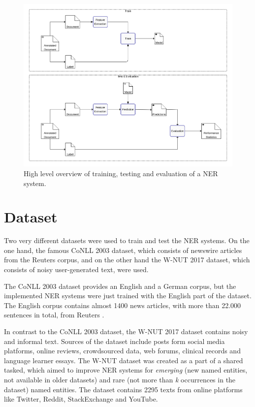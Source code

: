 \documentclass[12pt]{book}
\begin{document}
	\begin{figure}
		\begin{center}
			\includegraphics[width=\linewidth]{img/train_and_test.png}
		\end{center}
		\caption{High level overview of training, testing and evaluation of a NER system.}
		\label{fig:overview}
	\end{figure}


	\section{Dataset}
	
	Two very different datasets were used to train and test the NER systems. On the one hand, the famous CoNLL 2003 \cite{tjongkimsang2003conll} dataset, which consists of newswire articles from the Reuters corpus, and on the other hand the W-NUT 2017 \cite{derczynski2017results} dataset, which consists of noisy user-generated text, were used.
	
	The CoNLL 2003 dataset provides an English and a German corpus, but the implemented NER systems were just trained with the English part of the dataset. The English corpus contains almost 1400 news articles, with more than 22.000 sentences in total, from Reuters \cite{reuters}.
	
	In contrast to the CoNLL 2003 dataset, the W-NUT 2017 dataset contains noisy and informal text. Sources of the dataset include posts form social media platforms, online reviews, crowdsourced data, web forums, clinical records and language learner essays. The W-NUT dataset was created as a part of a shared tasked, which aimed to improve NER systems for \textit{emerging} (new named entities, not available in older datasets) and rare (not more than \textit{k} occurrences in the dataset) named entities. The dataset contains 2295 texts from online platforms like Twitter, Reddit, StackExchange and YouTube.
	
\end{document}
